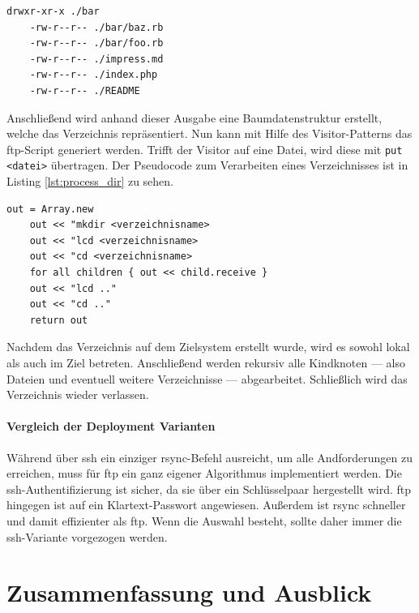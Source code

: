 \begin{lstlisting}[caption=Beispielausgabe für gefundene Pfade,label={lst:gen_path_list_example}]
	drwxr-xr-x ./bar
	-rw-r--r-- ./bar/baz.rb
	-rw-r--r-- ./bar/foo.rb
	-rw-r--r-- ./impress.md
	-rw-r--r-- ./index.php
	-rw-r--r-- ./README
\end{lstlisting}
     
Anschließend wird anhand dieser Ausgabe eine Baumdatenstruktur erstellt, welche das Verzeichnis repräsentiert. Nun kann mit Hilfe des Visitor-Patterns das \gls{ftp}-Script generiert werden. Trifft der Visitor auf eine Datei, wird diese mit \lstinline!put <datei>! übertragen. Der Pseudocode zum Verarbeiten eines Verzeichnisses ist in Listing \ref{lst:process_dir} zu sehen.

\begin{lstlisting}[caption=Verarbeitung eines Verzeichnisses,label={lst:process_dir}]
	out = Array.new
	out << "mkdir <verzeichnisname>
	out << "lcd <verzeichnisname>
	out << "cd <verzeichnisname>
	for all children { out << child.receive }
	out << "lcd .."
	out << "cd .."
	return out
\end{lstlisting}

Nachdem das Verzeichnis auf dem Zielsystem erstellt wurde, wird es sowohl lokal als auch im Ziel betreten. Anschließend werden rekursiv alle Kindknoten — also Dateien und eventuell weitere Verzeichnisse — abgearbeitet. Schließlich wird das Verzeichnis wieder verlassen.


\paragraph{Vergleich der Deployment Varianten} %
\label{ssub:vergleich_der_deployment_varianten}

Während über \gls{ssh} ein einziger rsync-Befehl ausreicht, um alle Andforderungen zu erreichen, muss für \gls{ftp} ein ganz eigener Algorithmus implementiert werden. Die \gls{ssh}-Authentifizierung ist sicher, da sie über ein Schlüsselpaar hergestellt wird. \gls{ftp} hingegen ist auf ein Klartext-Passwort angewiesen. Außerdem ist rsync schneller und damit effizienter als \gls{ftp}. Wenn die Auswahl besteht, sollte daher immer die \gls{ssh}-Variante vorgezogen werden.





\section{Zusammenfassung und Ausblick} %
\label{sec:zusammenfassung_und_ausblick}
